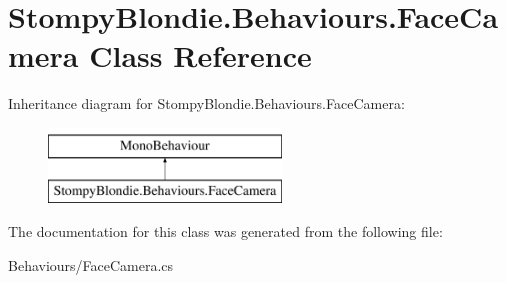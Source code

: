 \hypertarget{class_stompy_blondie_1_1_behaviours_1_1_face_camera}{}\section{Stompy\+Blondie.\+Behaviours.\+Face\+Camera Class Reference}
\label{class_stompy_blondie_1_1_behaviours_1_1_face_camera}
Inheritance diagram for Stompy\+Blondie.\+Behaviours.\+Face\+Camera\+:\begin{figure}[H]
\begin{center}
\leavevmode
\includegraphics[height=2.000000cm]{class_stompy_blondie_1_1_behaviours_1_1_face_camera}
\end{center}
\end{figure}


The documentation for this class was generated from the following file\+:\begin{DoxyCompactItemize}
\item 
Behaviours/Face\+Camera.\+cs\end{DoxyCompactItemize}
